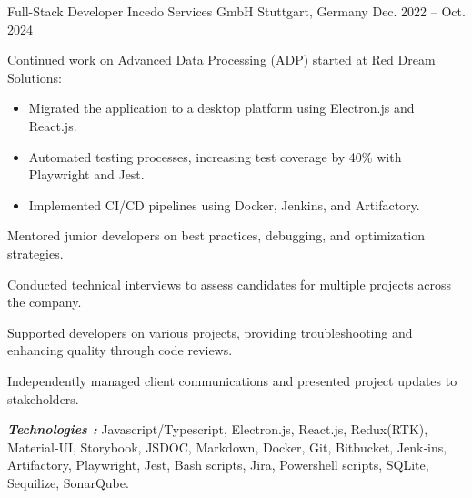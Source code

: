 

\begin{cventries}

  \cventry
    {Full-Stack Developer} %
    {Incedo Services GmbH} %
    {Stuttgart, Germany} %
    {Dec. 2022 – Oct. 2024} %
    {
      \begin{cvitems} %
        \item {Continued work on Advanced Data Processing (ADP) started at Red Dream Solutions:
        \begin{itemize}
          \item{Migrated the application to a desktop platform using Electron.js and React.js.}
          \item{Automated testing processes, increasing test coverage by 40\% with Playwright and Jest.}
          \item{Implemented CI/CD pipelines using Docker, Jenkins, and Artifactory.}
        \end{itemize}
        }
        \item {Mentored junior developers on best practices, debugging, and optimization strategies.}
        \item {Conducted technical interviews to assess candidates for multiple projects across the company.}
        \item {Supported developers on various projects, providing troubleshooting and enhancing quality through code reviews.}
        \item {Independently managed client communications and presented project updates to stakeholders.}
       \end{cvitems}
       \vspace{5mm}
      \textbf{\textit{Technologies :}} Javascript/Typescript, Electron.js, React.js, Redux(RTK), Material‐UI,
       Storybook, JSDOC, Markdown, Docker, Git, Bitbucket, Jenk‐ins, Artifactory,
        Playwright, Jest, Bash scripts, Jira, Powershell scripts, SQLite, Sequilize, SonarQube.
      \vspace{5mm}
    }


\end{cventries}

